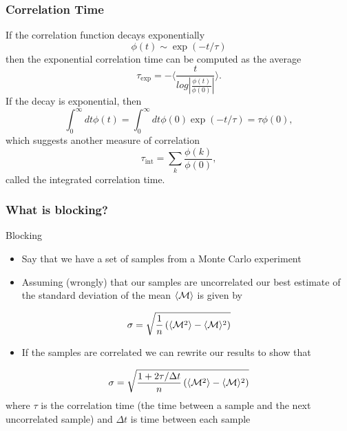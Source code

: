 \documentclass{beamer}
\begin{document}
\begin{frame}
\frametitle{Correlation Time}

\begin{block}{}

If the correlation function decays exponentially
\[ \phi (t) \sim \exp{(-t/\tau)}\]
then the exponential correlation time can be computed as the average
\[   \tau_{\mathrm{exp}}  =  -\langle  \frac{t}{log|\frac{\phi(t)}{\phi(0)}|} \rangle. \]
If the decay is exponential, then
\[  \int_0^{\infty} dt \phi(t)  = \int_0^{\infty} dt \phi(0)\exp{(-t/\tau)}  = \tau \phi(0),\] 
which  suggests another measure of correlation
\[   \tau_{\mathrm{int}} = \sum_k \frac{\phi(k)}{\phi(0)}, \]
called the integrated correlation time.
\end{block}
\end{frame}

\begin{frame}
\frametitle{What is blocking?}

\begin{block}{Blocking }
\begin{itemize}
    \item Say that we have a set of samples from a Monte Carlo experiment

    \item Assuming (wrongly) that our samples are uncorrelated our best estimate of the standard deviation of the mean $\langle {\cal M}\rangle$ is given by
\end{itemize}

\noindent
\[
\sigma=\sqrt{\frac{1}{n}\left(\langle {\cal M}^2\rangle-\langle {\cal M}\rangle^2\right)} 
\]
\begin{itemize}
    \item If the samples are correlated we can rewrite our results to show  that
\end{itemize}

\noindent
\[
\sigma=\sqrt{\frac{1+2\tau/\Delta t}{n}\left(\langle {\cal M}^2\rangle-\langle {\cal M}\rangle^2\right)}
\]
      where $\tau$ is the correlation time (the time between a sample and the next uncorrelated sample) and $\Delta t$ is time between each sample
\end{block}
\end{frame}
\end{document}
